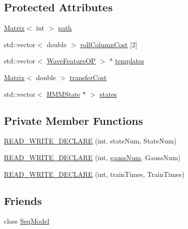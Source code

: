 \subsection*{Protected Attributes}
\begin{DoxyCompactItemize}
\item 
\hyperlink{configure__basic_8h_a566a006016cf65b1b01bd2bc633e1c12}{Matrix}$<$ int $>$ \hyperlink{class_h_m_m_automaton_a231123e55258281030977666a4f20eb2}{path}
\item 
std\+::vector$<$ double $>$ \hyperlink{class_h_m_m_automaton_a17bbaefff43e3a67f6c3614b6ccdac9c}{roll\+Column\+Cost} \mbox{[}2\mbox{]}
\item 
std\+::vector$<$ \hyperlink{class_wave_feature_o_p}{Wave\+Feature\+O\+P} $>$ $\ast$ \hyperlink{class_h_m_m_automaton_a9932eb5aa8ff484ac2406f98498595cf}{templates}
\item 
\hyperlink{configure__basic_8h_a566a006016cf65b1b01bd2bc633e1c12}{Matrix}$<$ double $>$ \hyperlink{class_h_m_m_automaton_af2b7d9675b77191e808e8a0501313f69}{transfer\+Cost}
\item 
std\+::vector$<$ \hyperlink{class_h_m_m_state}{H\+M\+M\+State} $\ast$ $>$ \hyperlink{class_h_m_m_automaton_a3ffe1d6d2d66c2bcfefb1339140c513b}{states}
\end{DoxyCompactItemize}
\subsection*{Private Member Functions}
\begin{DoxyCompactItemize}
\item 
\hyperlink{class_h_m_m_automaton_a7338d8ef8f07f6e625b088e79f3da96d}{R\+E\+A\+D\+\_\+\+W\+R\+I\+T\+E\+\_\+\+D\+E\+C\+L\+A\+R\+E} (int, state\+Num, State\+Num)
\item 
\hyperlink{class_h_m_m_automaton_aeb3e5fa260e4a3e321ef793013a270d6}{R\+E\+A\+D\+\_\+\+W\+R\+I\+T\+E\+\_\+\+D\+E\+C\+L\+A\+R\+E} (int, \hyperlink{pro6__demo_8cpp_a923ffcfa3c56ccdba17bc4e700247d54}{gauss\+Num}, Gauss\+Num)
\item 
\hyperlink{class_h_m_m_automaton_ae7f461bacc7daf2d3c2f4b7f233e0cef}{R\+E\+A\+D\+\_\+\+W\+R\+I\+T\+E\+\_\+\+D\+E\+C\+L\+A\+R\+E} (int, train\+Times, Train\+Times)
\end{DoxyCompactItemize}
\subsection*{Friends}
\begin{DoxyCompactItemize}
\item 
class \hyperlink{class_h_m_m_automaton_a1b622e128d992231899ba78ca9c72507}{Seq\+Model}
\end{DoxyCompactItemize}


